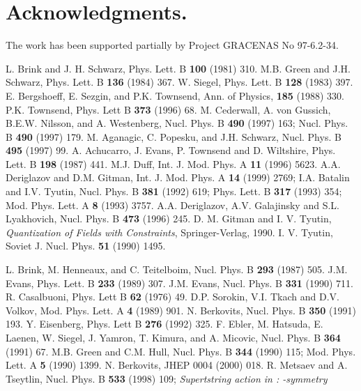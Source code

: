 \documentclass[a4paper]{article}
\begin{document}
\section*{Acknowledgments.}

The work has been supported partially by Project GRACENAS No 97-6.2-34.
   
\begin{thebibliography}{nn}
\bibitem{} L. Brink and J. H. Schwarz, Phys. Lett. B {\bf 100}
(1981) 310.
\bibitem{} M.B. Green and J.H. Schwarz, Phys. Lett. B {\bf 136}
(1984) 367.
\bibitem{} W. Siegel, Phys. Lett. B {\bf 128} (1983) 397.
\bibitem{} E. Bergshoeff, E. Sezgin, and P.K. Townsend, Ann. of Physics,
{\bf 185} (1988) 330.
\bibitem{} P.K. Townsend, Phys. Lett B {\bf 373} (1996) 68.
\bibitem{} M. Cederwall, A. von Gussich, B.E.W. Nilsson, and A.
Westenberg, Nucl. Phys. B {\bf 490} (1997) 163; Nucl. Phys. B {\bf 490}
(1997) 179.
\bibitem{} M. Aganagic, C. Popesku, and J.H. Schwarz, Nucl. Phys.
B {\bf 495} (1997) 99.
\bibitem{} A. Achucarro, J. Evans, P. Townsend and D. Wiltshire,
Phys. Lett. B {\bf 198} (1987) 441.
\bibitem{} M.J. Duff, Int. J. Mod. Phys. A {\bf 11} (1996) 5623.
\bibitem{} A.A. Deriglazov and D.M. Gitman, Int. J. Mod. Phys. A 
{\bf 14} (1999) 2769;
\bibitem{} I.A. Batalin and I.V. Tyutin, Nucl. Phys. B {\bf 381} (1992)
619; Phys. Lett. B {\bf 317} (1993) 354; Mod. Phys. Lett. A {\bf 8}
(1993) 3757.
\bibitem{} A.A. Deriglazov, A.V. Galajinsky and 
S.L. Lyakhovich, Nucl. Phys. B {\bf 473} (1996) 245. 
\bibitem{} D. M. Gitman and I. V. Tyutin, {\em Quantization of Fields
with Constraints}, Springer-Verlag, 1990.
\bibitem{} I. V. Tyutin, Soviet J. Nucl. Phys. {\bf 51} (1990) 1495. 
\item{} L. Brink, M. Henneaux, and C. Teitelboim, Nucl. Phys. B {\bf
293} (1987) 505.
\bibitem{} J.M. Evans, Phys. Lett. B {\bf 233} (1989) 307.
\bibitem{} J.M. Evans, Nucl. Phys. B {\bf 331} (1990) 711.
\bibitem{} R. Casalbuoni, Phys. Lett B {\bf 62} (1976) 49.
\bibitem{} D.P. Sorokin, V.I. Tkach and D.V. Volkov, Mod. Phys. Lett. 
A {\bf 4} (1989) 901.
\bibitem{} N. Berkovits, Nucl. Phys. B {\bf 350} (1991) 193.
 Y. Eisenberg, Phys. Lett B {\bf 276} (1992) 325.
\bibitem{} F. Ebler, M. Hatsuda, E. Laenen, W. Siegel, J. Yamron, T.
Kimura, and A. Micovic, Nucl. Phys. B {\bf 364} (1991) 67.
\bibitem{} M.B. Green and C.M. Hull, Nucl. Phys. B {\bf 344} (1990) 115;
Mod. Phys. Lett. A {\bf 5} (1990) 1399.
\bibitem{} N. Berkovits, JHEP 0004 (2000) 018.
\bibitem{} R. Metsaev and A. Tseytlin, Nucl. Phys. B {\bf 533} (1998) 
109; {\em Supertstring action in \coordHE{}: \myHighlight{$\kappa$}\coordHE{}-symmetry 
}
\end{thebibliography}
\end{document}
